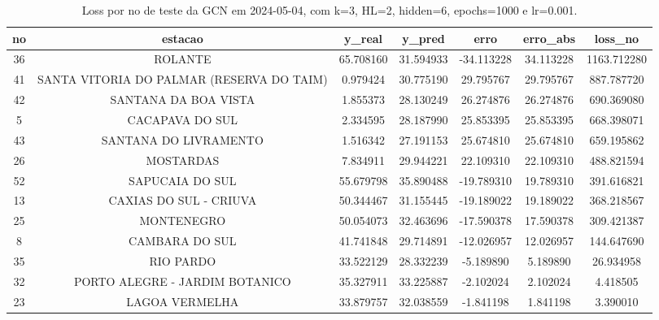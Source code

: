 \begin{table}[h]
\centering
\caption{Loss por no de teste da GCN em 2024-05-04, com k=3, HL=2, hidden=6, epochs=1000 e lr=0.001.}
\label{tab:gcn_loss_k3_hl2_h6_e1000_d20240504}
\begin{tabular}{ccccccc}
\toprule
no & estacao & y\_real & y\_pred & erro & erro\_abs & loss\_no \\
\midrule
36 & ROLANTE & 65.708160 & 31.594933 & -34.113228 & 34.113228 & 1163.712280 \\
41 & SANTA VITORIA DO PALMAR (RESERVA DO TAIM) & 0.979424 & 30.775190 & 29.795767 & 29.795767 & 887.787720 \\
42 & SANTANA DA BOA VISTA & 1.855373 & 28.130249 & 26.274876 & 26.274876 & 690.369080 \\
5 & CACAPAVA DO SUL & 2.334595 & 28.187990 & 25.853395 & 25.853395 & 668.398071 \\
43 & SANTANA DO LIVRAMENTO & 1.516342 & 27.191153 & 25.674810 & 25.674810 & 659.195862 \\
26 & MOSTARDAS & 7.834911 & 29.944221 & 22.109310 & 22.109310 & 488.821594 \\
52 & SAPUCAIA DO SUL & 55.679798 & 35.890488 & -19.789310 & 19.789310 & 391.616821 \\
13 & CAXIAS DO SUL - CRIUVA & 50.344467 & 31.155445 & -19.189022 & 19.189022 & 368.218567 \\
25 & MONTENEGRO & 50.054073 & 32.463696 & -17.590378 & 17.590378 & 309.421387 \\
8 & CAMBARA DO SUL & 41.741848 & 29.714891 & -12.026957 & 12.026957 & 144.647690 \\
35 & RIO PARDO & 33.522129 & 28.332239 & -5.189890 & 5.189890 & 26.934958 \\
32 & PORTO ALEGRE - JARDIM BOTANICO & 35.327911 & 33.225887 & -2.102024 & 2.102024 & 4.418505 \\
23 & LAGOA VERMELHA & 33.879757 & 32.038559 & -1.841198 & 1.841198 & 3.390010 \\
\bottomrule
\end{tabular}
\end{table}
